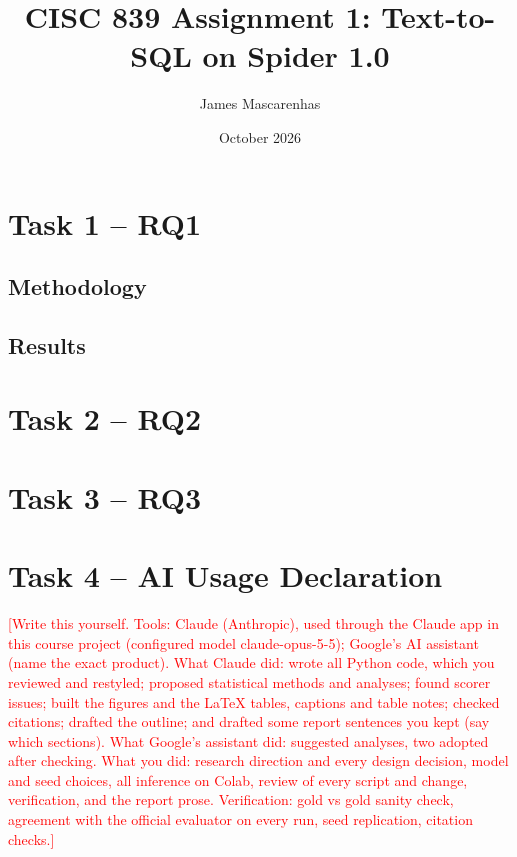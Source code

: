 \documentclass[11pt]{article}
\title{CISC 839 Assignment 1: Text-to-SQL on Spider 1.0}
\author{James Mascarenhas}
\date{October 2026}
\newcommand{\todo}[1]{\textcolor{red}{[#1]}}
\begin{document}
\maketitle

\section*{Task 1 -- RQ1}
\subsection*{Methodology}


\subsection*{Results}


\clearpage
\section*{Task 2 -- RQ2}


\clearpage
\section*{Task 3 -- RQ3}


\clearpage
\section*{Task 4 -- AI Usage Declaration}
\todo{Write this yourself. Tools: Claude (Anthropic), used through the Claude app in this course project (configured model claude-opus-5-5); Google's AI assistant (name the exact product). What Claude did: wrote all Python code, which you reviewed and restyled; proposed statistical methods and analyses; found scorer issues; built the figures and the LaTeX tables, captions and table notes; checked citations; drafted the outline; and drafted some report sentences you kept (say which sections). What Google's assistant did: suggested analyses, two adopted after checking. What you did: research direction and every design decision, model and seed choices, all inference on Colab, review of every script and change, verification, and the report prose. Verification: gold vs gold sanity check, agreement with the official evaluator on every run, seed replication, citation checks.}



\end{document}
